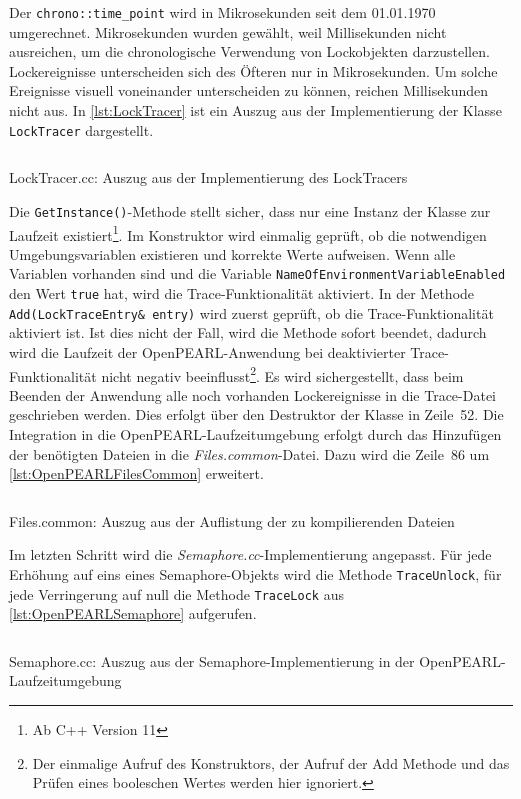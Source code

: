 Der \texttt{chrono::\-time\_point} wird in Mikrosekunden seit dem 01.01.1970
umgerechnet. Mikrosekunden wurden gewählt, weil Millisekunden nicht ausreichen,
um die chronologische Verwendung von Lockobjekten darzustellen. Lockereignisse
unterscheiden sich des Öfteren nur in Mikrosekunden. Um solche Ereignisse
visuell voneinander unterscheiden zu können, reichen Millisekunden nicht aus. In
\cref{lst:LockTracer} ist ein Auszug aus der Implementierung der Klasse
\texttt{Lock\-Tracer} dargestellt.
\begin{listing}[ht]
  \inputminted[frame=lines,linenos,firstline=11,lastline=58]{cpp}{./cpp/LockTracer.cc}
  \caption{LockTracer.cc: Auszug aus der Implementierung des LockTracers}
  \label{lst:LockTracer}
\end{listing}
Die \texttt{Get\-Instance()}-Methode stellt sicher, dass nur eine Instanz der
Klasse zur Laufzeit existiert\footnote{Ab C++ Version 11}. Im Konstruktor wird
einmalig geprüft, ob die notwendigen Umgebungsvariablen existieren und korrekte
Werte aufweisen. Wenn alle Variablen vorhanden sind und die Variable
\texttt{Name\-Of\-Environment\-Variable\-Enabled} den Wert \texttt{true} hat,
wird die Trace-Funktionalität aktiviert. In der Methode
\texttt{Add(Lock\-Trace\-Entry\& entry)} wird zuerst geprüft, ob die
Trace-Funktionalität aktiviert ist. Ist dies nicht der Fall, wird die Methode
sofort beendet, dadurch wird die Laufzeit der OpenPEARL-Anwendung bei
deaktivierter Trace-Funktionalität nicht negativ beeinflusst\footnote{Der
einmalige Aufruf des Konstruktors, der Aufruf der Add Methode und das Prüfen
eines booleschen Wertes werden hier ignoriert.}. Es wird sichergestellt, dass
beim Beenden der Anwendung alle noch vorhanden Lockereignisse in die Trace-Datei
geschrieben werden. Dies erfolgt über den Destruktor der Klasse in Zeile~52. Die
Integration in die OpenPEARL-Laufzeitumgebung erfolgt durch das Hinzufügen der
benötigten Dateien in die \emph{Files.common}-Datei. Dazu wird die Zeile~86 um
\cref{lst:OpenPEARLFilesCommon} erweitert.
\begin{listing}[ht]
  \inputminted[frame=lines,linenos,firstline=86,lastline=88]{bash}{./OpenPEARL/Files.common}
  \caption{Files.common: Auszug aus der Auflistung der zu kompilierenden Dateien}
  \label{lst:OpenPEARLFilesCommon}
\end{listing}
Im letzten Schritt wird die \emph{Semaphore.cc}-Implementierung angepasst. Für
jede Erhöhung auf eins eines Semaphore-Objekts wird die Methode
\texttt{Trace\-Unlock}, für jede Verringerung auf null die Methode
\texttt{Trace\-Lock} aus \cref{lst:OpenPEARLSemaphore} aufgerufen.
\begin{listing}[ht]
  \inputminted[frame=lines,linenos,firstline=93,lastline=111]{cpp}{./OpenPEARL/Semaphore.cc}
  \caption{Semaphore.cc: Auszug aus der Semaphore-Implementierung in der OpenPEARL-Laufzeitumgebung}
  \label{lst:OpenPEARLSemaphore}
\end{listing}

